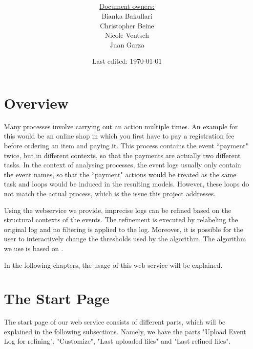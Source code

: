 \documentclass[notitlepage]{article}
\title{%
	\documentName\text{ } \\
  \large \projectName\text{ } \\
  }
\author{
	\large \underline{Document owners:}\\ 
	Bianka Bakullari\\
	\texttt{}
	Christopher Beine\\
	\texttt{}
	Nicole Ventsch\\
	\texttt{}
	Juan Garza\\
	\texttt{}
}
\date{\small{Last edited: \today}}
\begin{document}
\begin{titlepage}
\clearpage\maketitle			%
\thispagestyle{fancy}
\tableofcontents
\end{titlepage}

\rfoot{\thepage}				%


\begin{flushleft}				%

\section{Overview}

Many processes involve carrying out an action multiple times. An example for this would be an online shop in which you first have to pay a registration fee before ordering an item and paying it. This process contains the event ``payment" twice, but in different contexts, so that the payments are actually two different tasks. In the context of analysing processes, the event logs usually only contain the event names, so that the ``payment" actions would be treated as the same task and loops would be induced in the resulting models. However, these loops do not match the actual process, which is the issue this project addresses. 

Using the webservice we provide, imprecise logs can be refined based on the structural contexts of the events. The refinement is executed by relabeling the original log and no filtering is applied to the log. Moreover, it is possible for the user to interactively change the thresholds used by the algorithm. The algorithm we use is based on \cite{paper}.

In the following chapters, the usage of this web service will be explained.




\section{The Start Page}

The start page of our web service consists of different parts, which will be explained in the following subsections. Namely, we have the parts "Upload Event Log for refining", "Customize", "Last uploaded files" and "Last refined files".


\end{flushleft}
\end{document}
